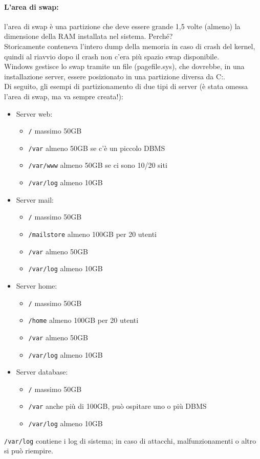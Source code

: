 \documentclass[a4paper]{report}
\begin{document}
\paragraph{L'area di swap: } l'area di swap è una partizione che deve essere grande 1,5 volte (almeno) la dimensione della RAM installata nel sistema. Perché? \\
Storicamente conteneva l'intero dump della memoria in caso di crash
del kernel, quindi al riavvio dopo il crash non c'era più spazio swap
disponibile.\\
Windows gestisce lo swap tramite un file (pagefile.sys),
che dovrebbe, in una installazione server, essere
posizionato in una partizione diversa da C:.\\
Di seguito, gli esempi di partizionamento di due tipi di server (è stata omessa l'area di swap, ma va sempre creata!):
\begin{itemize}
\item Server web:
\begin{itemize}
\item \texttt{/} massimo 50GB
\item \texttt{/var} almeno 50GB se c'è un piccolo DBMS
\item \texttt{/var/www} almeno 50GB se ci sono 10/20 siti
\item \texttt{/var/log} almeno 10GB
\end{itemize}
\item Server mail:
\begin{itemize}
\item \texttt{/} massimo 50GB
\item \texttt{/mailstore} almeno 100GB per 20 utenti
\item \texttt{/var} almeno 50GB
\item \texttt{/var/log} almeno 10GB
\end{itemize}
\item Server home:
\begin{itemize}
\item \texttt{/} massimo 50GB
\item \texttt{/home} almeno 100GB per 20 utenti
\item \texttt{/var} almeno 50GB
\item \texttt{/var/log} almeno 10GB
\end{itemize}
\item Server database:
\begin{itemize}
\item \texttt{/} massimo 50GB
\item \texttt{/var} anche più di 100GB, può ospitare uno o più DBMS
\item \texttt{/var/log} almeno 10GB
\end{itemize}
\end{itemize}
\texttt{/var/log} contiene i log di sistema; in caso di attacchi, malfunzionamenti o altro si può riempire.
\end{document}
